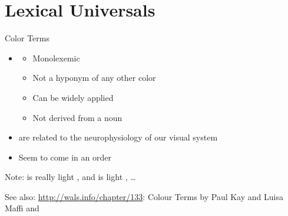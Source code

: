 \section{Lexical Universals}

\begin{frame}{Color Terms}

\begin{itemize}

\item {}
  \begin{itemize}
  \item Monolexemic
  \item Not a hyponym of any other color
  \item Can be widely applied
  \item Not derived from a noun
  \end{itemize}
\item {} are related to the neurophysiology of our visual system
\item Seem to come in an order \\

\hspace*{-3em}
\end{itemize}

Note:  is really light , and   is light , \ldots


See also: \url{http://wals.info/chapter/133}: Colour Terms
by Paul Kay and Luisa Maffi and \citep{Kay:Maffi:2000}
\end{frame}

